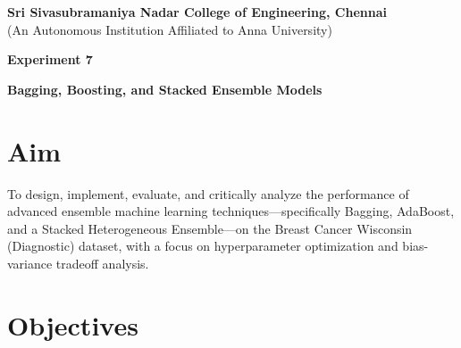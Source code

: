 \documentclass[11pt]{article}
\begin{document}
\begin{center}
    \large \textbf{Sri Sivasubramaniya Nadar College of Engineering, Chennai} \\
    (An Autonomous Institution Affiliated to Anna University) \\
    \vspace{0.3cm}
\end{center}
\begin{table}[h]
\renewcommand{\arraystretch}{1.4}
\end{table}

\begin{center}
    \textbf{\Large Experiment 7}
\end{center}

\begin{center}
    \textbf{Bagging, Boosting, and Stacked Ensemble Models}
\end{center}

\section{Aim}

To design, implement, evaluate, and critically analyze the performance of advanced ensemble machine learning techniques—specifically Bagging, AdaBoost, and a Stacked Heterogeneous Ensemble—on the Breast Cancer Wisconsin (Diagnostic) dataset, with a focus on hyperparameter optimization and bias-variance tradeoff analysis.
\section{Objectives}
\end{document}
